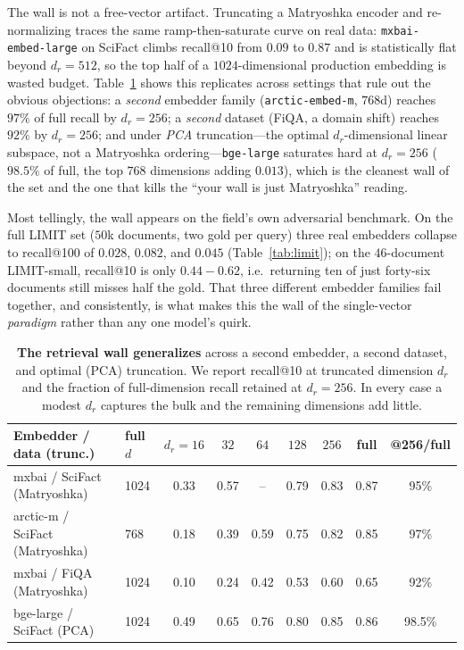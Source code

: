 \documentclass{article}
\newcommand{\dr}{d_r}
\begin{document}
The wall is not a free-vector artifact. Truncating a Matryoshka encoder
\citep{kusupati2022matryoshka} and re-normalizing traces the same ramp-then-saturate curve on real
data: \texttt{mxbai-embed-large} on SciFact climbs recall@10 from $0.09$ to $0.87$ and is
statistically flat beyond $\dr\!=\!512$, so the top half of a $1024$-dimensional production
embedding is wasted budget. Table~\ref{tab:generality} shows this replicates across settings that
rule out the obvious objections: a \emph{second} embedder family (\texttt{arctic-embed-m}, $768$d)
reaches $97\%$ of full recall by $\dr\!=\!256$; a \emph{second} dataset (FiQA, a domain shift)
reaches $92\%$ by $\dr\!=\!256$; and under \emph{PCA} truncation---the optimal $\dr$-dimensional
linear subspace, not a Matryoshka ordering---\texttt{bge-large} saturates hard at $\dr\!=\!256$
($98.5\%$ of full, the top $768$ dimensions adding $0.013$), which is the cleanest wall of the set
and the one that kills the ``your wall is just Matryoshka'' reading.

Most tellingly, the wall appears on the field's own adversarial benchmark. On the full LIMIT set
\citep{weller2025limit} ($50$k documents, two gold per query) three real embedders collapse to
recall@100 of $0.028$, $0.082$, and $0.045$ (Table~\ref{tab:limit}); on the $46$-document LIMIT-small,
recall@10 is only $0.44\!-\!0.62$, i.e.\ returning ten of just forty-six documents still misses
half the gold. That three different embedder families fail together, and consistently, is what
makes this the wall of the single-vector \emph{paradigm} rather than any one model's quirk.

\begin{table}[t]
\caption{\textbf{The retrieval wall generalizes} across a second embedder, a second dataset, and
optimal (PCA) truncation. We report recall@10 at truncated dimension $\dr$ and the fraction of
full-dimension recall retained at $\dr\!=\!256$. In every case a modest $\dr$ captures the bulk and
the remaining dimensions add little.}
\label{tab:generality}
\centering\small
\begin{tabular}{@{}llccccccc@{}}
\toprule
Embedder / data (trunc.) & full $d$ & $\dr{=}16$ & $32$ & $64$ & $128$ & $256$ & full & @256/full\\
\midrule
mxbai / SciFact (Matryoshka)   & 1024 & 0.33 & 0.57 & --   & 0.79 & 0.83 & 0.87 & 95\%\\
arctic-m / SciFact (Matryoshka)& 768  & 0.18 & 0.39 & 0.59 & 0.75 & 0.82 & 0.85 & 97\%\\
mxbai / FiQA (Matryoshka)      & 1024 & 0.10 & 0.24 & 0.42 & 0.53 & 0.60 & 0.65 & 92\%\\
bge-large / SciFact (PCA)      & 1024 & 0.49 & 0.65 & 0.76 & 0.80 & 0.85 & 0.86 & 98.5\%\\
\bottomrule
\end{tabular}
\end{table}
\end{document}
